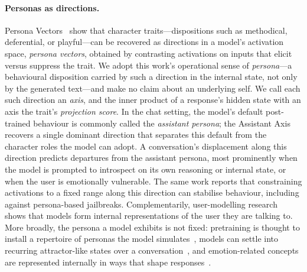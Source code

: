 \documentclass{article}
\begin{document}
\paragraph{Personas as directions.}
Persona Vectors~\cite{personavectors} show that character traits---dispositions such as methodical, deferential, or playful---can be recovered as directions in a model's activation space, \emph{persona vectors}, obtained by contrasting activations on inputs that elicit versus suppress the trait. We adopt this work's operational sense of \emph{persona}---a behavioural disposition carried by such a direction in the internal state, not only by the generated text---and make no claim about an underlying self. We call each such direction an \emph{axis}, and the inner product of a response's hidden state with an axis the trait's \emph{projection score}. In the chat setting, the model's default post-trained behaviour is commonly called the \emph{assistant persona}; the Assistant Axis~\cite{assistantaxis} recovers a single dominant direction that separates this default from the character roles the model can adopt. A conversation's displacement along this direction predicts departures from the assistant persona, most prominently when the model is prompted to introspect on its own reasoning or internal state, or when the user is emotionally vulnerable. The same work reports that constraining activations to a fixed range along this direction can stabilise behaviour, including against persona-based jailbreaks. Complementarily, user-modelling research~\cite{transluce,latentqa} shows that models form internal representations of the user they are talking to. More broadly, the persona a model exhibits is not fixed: pretraining is thought to install a repertoire of personas the model simulates~\cite{anthropicpsm,syntheticpersona}, models can settle into recurring attractor-like states over a conversation~\cite{attractor}, and emotion-related concepts are represented internally in ways that shape responses~\cite{emotions}.
\end{document}
